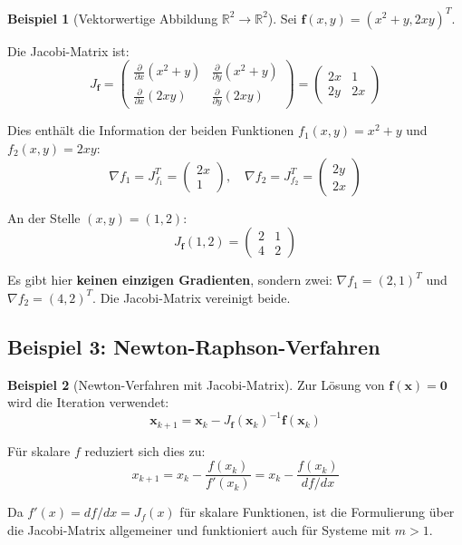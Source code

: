 ﻿\documentclass[a4paper,12pt]{article}
\theoremstyle{definition}
\newtheorem{beispiel}{Beispiel}
\begin{document}
\begin{beispiel}[Vektorwertige Abbildung $\mathbb{R}^2 \to \mathbb{R}^2$]
	Sei $\boldsymbol{f}(x, y) = (x^2 + y, 2xy)^T$.
	
	Die Jacobi-Matrix ist:
	\[
	J_{\boldsymbol{f}} = \begin{pmatrix}
		\frac{\partial}{\partial x}(x^2 + y) & \frac{\partial}{\partial y}(x^2 + y) \\
		\frac{\partial}{\partial x}(2xy) & \frac{\partial}{\partial y}(2xy)
	\end{pmatrix} = \begin{pmatrix}
		2x & 1 \\
		2y & 2x
	\end{pmatrix}
	\]
	
	Dies enthält die Information der beiden Funktionen $f_1(x,y) = x^2 + y$ und $f_2(x,y) = 2xy$:
	\[
	\nabla f_1 = J_{f_1}^T = \begin{pmatrix} 2x \\ 1 \end{pmatrix}, \quad
	\nabla f_2 = J_{f_2}^T = \begin{pmatrix} 2y \\ 2x \end{pmatrix}
	\]
	
	An der Stelle $(x, y) = (1, 2)$:
	\[
	J_{\boldsymbol{f}}(1, 2) = \begin{pmatrix} 2 & 1 \\ 4 & 2 \end{pmatrix}
	\]
	
	Es gibt hier \textbf{keinen einzigen Gradienten}, sondern zwei: $\nabla f_1 = (2, 1)^T$ und $\nabla f_2 = (4, 2)^T$. Die Jacobi-Matrix vereinigt beide.
\end{beispiel}

\subsection{Beispiel 3: Newton-Raphson-Verfahren}

\begin{beispiel}[Newton-Verfahren mit Jacobi-Matrix]
	Zur Lösung von $\boldsymbol{f}(\boldsymbol{x}) = \boldsymbol{0}$ wird die Iteration verwendet:
	\[
	\boldsymbol{x}_{k+1} = \boldsymbol{x}_k - J_{\boldsymbol{f}}(\boldsymbol{x}_k)^{-1} \boldsymbol{f}(\boldsymbol{x}_k)
	\]
	
	Für skalare $f$ reduziert sich dies zu:
	\[
	x_{k+1} = x_k - \frac{f(x_k)}{f'(x_k)} = x_k - \frac{f(x_k)}{df/dx}
	\]
	
	Da $f'(x) = df/dx = J_f(x)$ für skalare Funktionen, ist die Formulierung über die Jacobi-Matrix allgemeiner und funktioniert auch für Systeme mit $m > 1$.
\end{beispiel}
\end{document}

